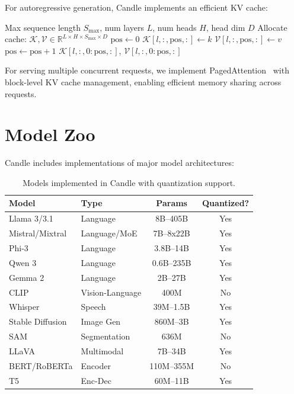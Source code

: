 \documentclass[11pt,twocolumn]{article}
\begin{document}
For autoregressive generation, Candle implements an efficient KV cache:

\begin{algorithm}[H]
\caption{Paged KV Cache}
\label{alg:kvcache}
\begin{algorithmic}[1]
\Require Max sequence length $S_{\max}$, num layers $L$, num heads $H$, head dim $D$
\State Allocate cache: $\mathcal{K}, \mathcal{V} \in \mathbb{R}^{L \times H \times S_{\max} \times D}$
\State $\text{pos} \gets 0$
    \State $\mathcal{K}[l, :, \text{pos}, :] \gets k$
    \State $\mathcal{V}[l, :, \text{pos}, :] \gets v$
    \State $\text{pos} \gets \text{pos} + 1$
\EndFunction
{}
    \State \Return $\mathcal{K}[l, :, 0:\text{pos}, :]$, $\mathcal{V}[l, :, 0:\text{pos}, :]$
\EndFunction
\end{algorithmic}
\end{algorithm}

For serving multiple concurrent requests, we implement PagedAttention~\cite{kwon2023vllm} with block-level KV cache management, enabling efficient memory sharing across requests.

\section{Model Zoo}
\label{sec:zoo}

Candle includes implementations of major model architectures:

\begin{table}[H]
\centering
\small
\begin{tabular}{llcc}
\toprule
\textbf{Model} & \textbf{Type} & \textbf{Params} & \textbf{Quantized?} \\
\midrule
Llama 3/3.1 & Language & 8B--405B & Yes \\
Mistral/Mixtral & Language/MoE & 7B--8x22B & Yes \\
Phi-3 & Language & 3.8B--14B & Yes \\
Qwen 3 & Language & 0.6B--235B & Yes \\
Gemma 2 & Language & 2B--27B & Yes \\
CLIP & Vision-Language & 400M & No \\
Whisper & Speech & 39M--1.5B & Yes \\
Stable Diffusion & Image Gen & 860M--3B & Yes \\
SAM & Segmentation & 636M & No \\
LLaVA & Multimodal & 7B--34B & Yes \\
BERT/RoBERTa & Encoder & 110M--355M & No \\
T5 & Enc-Dec & 60M--11B & Yes \\
\bottomrule
\end{tabular}
\caption{Models implemented in Candle with quantization support.}
\label{tab:models}
\end{table}
\end{document}
